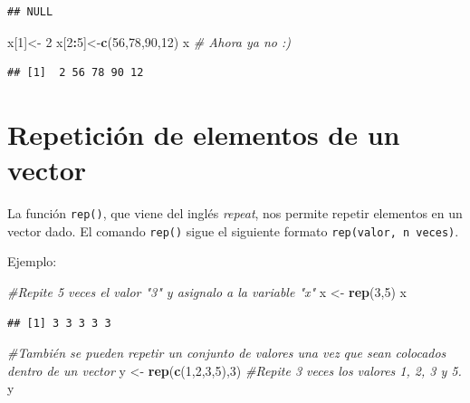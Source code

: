 \documentclass[
]{book}
\newenvironment{Shaded}{\begin{snugshade}}{\end{snugshade}}
\newcommand{\CommentTok}[1]{\textcolor[rgb]{0.56,0.35,0.01}{\textit{#1}}}
\newcommand{\DecValTok}[1]{\textcolor[rgb]{0.00,0.00,0.81}{#1}}
\newcommand{\FunctionTok}[1]{\textcolor[rgb]{0.13,0.29,0.53}{\textbf{#1}}}
\newcommand{\NormalTok}[1]{#1}
\newcommand{\OtherTok}[1]{\textcolor[rgb]{0.56,0.35,0.01}{#1}}
\newcommand{\SpecialCharTok}[1]{\textcolor[rgb]{0.81,0.36,0.00}{\textbf{#1}}}
\begin{document}
\begin{verbatim}
## NULL
\end{verbatim}

\begin{Shaded}
\begin{Highlighting}[]
\NormalTok{x[}\DecValTok{1}\NormalTok{]}\OtherTok{\textless{}{-}} \DecValTok{2}
\NormalTok{x[}\DecValTok{2}\SpecialCharTok{:}\DecValTok{5}\NormalTok{]}\OtherTok{\textless{}{-}}\FunctionTok{c}\NormalTok{(}\DecValTok{56}\NormalTok{,}\DecValTok{78}\NormalTok{,}\DecValTok{90}\NormalTok{,}\DecValTok{12}\NormalTok{)}
\NormalTok{x                 }\CommentTok{\# Ahora ya no :)}
\end{Highlighting}
\end{Shaded}

\begin{verbatim}
## [1]  2 56 78 90 12
\end{verbatim}

\hypertarget{repeticiuxf3n-de-elementos-de-un-vector}{%
\section{Repetición de elementos de un vector}\label{repeticiuxf3n-de-elementos-de-un-vector}}

La función \texttt{rep()}, que viene del inglés \emph{repeat}, nos permite repetir elementos en un vector dado.
El comando \texttt{rep()} sigue el siguiente formato \texttt{rep(valor,\ n\ veces)}.

Ejemplo:

\begin{Shaded}
\begin{Highlighting}[]
\CommentTok{\#Repite 5 veces el valor "3" y asignalo a la variable "x"}
\NormalTok{x }\OtherTok{\textless{}{-}} \FunctionTok{rep}\NormalTok{(}\DecValTok{3}\NormalTok{,}\DecValTok{5}\NormalTok{)}
\NormalTok{x}
\end{Highlighting}
\end{Shaded}

\begin{verbatim}
## [1] 3 3 3 3 3
\end{verbatim}

\begin{Shaded}
\begin{Highlighting}[]
\CommentTok{\#También se pueden repetir un conjunto de valores una vez que sean colocados dentro de un vector}
\NormalTok{y }\OtherTok{\textless{}{-}} \FunctionTok{rep}\NormalTok{(}\FunctionTok{c}\NormalTok{(}\DecValTok{1}\NormalTok{,}\DecValTok{2}\NormalTok{,}\DecValTok{3}\NormalTok{,}\DecValTok{5}\NormalTok{),}\DecValTok{3}\NormalTok{) }\CommentTok{\#Repite 3 veces los valores 1, 2, 3 y 5. }
\NormalTok{y}
\end{Highlighting}
\end{Shaded}
\end{document}
